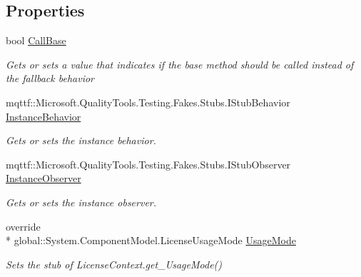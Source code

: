 \subsection*{Properties}
\begin{DoxyCompactItemize}
\item 
bool \hyperlink{class_system_1_1_component_model_1_1_fakes_1_1_stub_license_context_a34521064d81d879fd4c2aee412ea5fe1}{Call\-Base}
\begin{DoxyCompactList}\small\item\em Gets or sets a value that indicates if the base method should be called instead of the fallback behavior\end{DoxyCompactList}\item 
mqttf\-::\-Microsoft.\-Quality\-Tools.\-Testing.\-Fakes.\-Stubs.\-I\-Stub\-Behavior \hyperlink{class_system_1_1_component_model_1_1_fakes_1_1_stub_license_context_affe0109ed114d2323765db88160f33f8}{Instance\-Behavior}
\begin{DoxyCompactList}\small\item\em Gets or sets the instance behavior.\end{DoxyCompactList}\item 
mqttf\-::\-Microsoft.\-Quality\-Tools.\-Testing.\-Fakes.\-Stubs.\-I\-Stub\-Observer \hyperlink{class_system_1_1_component_model_1_1_fakes_1_1_stub_license_context_a5cfba997a7538681dad9be6b782974f1}{Instance\-Observer}
\begin{DoxyCompactList}\small\item\em Gets or sets the instance observer.\end{DoxyCompactList}\item 
override \\*
global\-::\-System.\-Component\-Model.\-License\-Usage\-Mode \hyperlink{class_system_1_1_component_model_1_1_fakes_1_1_stub_license_context_ad0de5ddeb6d5902f8fa1ba2d99868ab4}{Usage\-Mode}
\begin{DoxyCompactList}\small\item\em Sets the stub of License\-Context.\-get\-\_\-\-Usage\-Mode()\end{DoxyCompactList}\end{DoxyCompactItemize}


